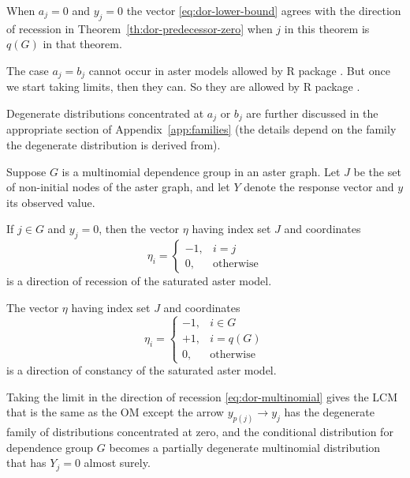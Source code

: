 When $a_j = 0$ and $y_j = 0$ the vector \eqref{eq:dor-lower-bound} agrees
with the direction of recession in Theorem~\ref{th:dor-predecessor-zero}
when $j$ in this theorem is $q(G)$ in that theorem.

The case $a_j = b_j$ cannot occur in aster models allowed
by R package .  But once we start
taking limits, then they can.  So they are allowed by R package .

Degenerate distributions concentrated at $a_j$ or $b_j$ are further
discussed in the appropriate section of Appendix~\ref{app:families}
(the details depend on the family the degenerate distribution is derived
from).

\begin{theorem} \label{th:dor-multinomial}
Suppose $G$ is a multinomial dependence group in an aster graph.
Let $J$ be the set of non-initial nodes of the aster graph,
and let $Y$ denote the response vector and $y$ its observed value.

If $j \in G$ and $y_j = 0$, then the vector $\eta$ having index set $J$
and coordinates
\begin{equation} \label{eq:dor-multinomial}
   \eta_i = \begin{cases} -1, & i = j \\
   0, & \text{otherwise} \end{cases}
\end{equation}
is a direction of recession of the saturated aster model.

The vector $\eta$ having index set $J$ and coordinates
\begin{equation} \label{eq:doc-multinomial}
   \eta_i = \begin{cases} -1, & i \in G \\
   +1, & i = q(G) \\
   0, & \text{otherwise} \end{cases}
\end{equation}
is a direction of constancy of the saturated aster model.

Taking the limit in the direction of recession \eqref{eq:dor-multinomial}
gives the LCM that is the same as the OM except the arrow
$y_{p(j)} \longrightarrow y_j$ has the degenerate family of distributions
concentrated at zero, and the conditional distribution for dependence group
$G$ becomes a partially degenerate multinomial distribution that has
$Y_j = 0$ almost surely.
\end{theorem}
